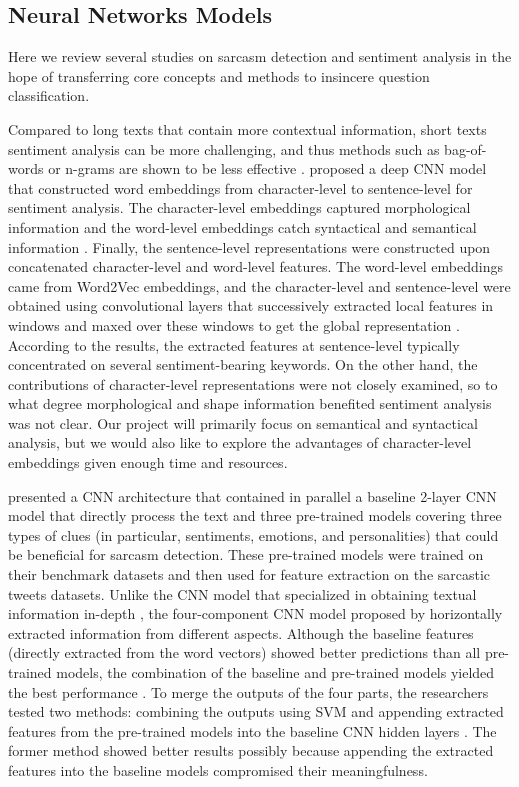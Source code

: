 \documentclass[12pt]{diazessay} %
\begin{document}
\subsection{Neural Networks Models} \label{nn-models}


Here we review several studies on sarcasm detection and sentiment analysis in the hope of transferring core concepts and methods to insincere question classification.

Compared to long texts that contain more contextual information, short texts sentiment analysis can be more challenging, and thus methods such as bag-of-words or n-grams are shown to be less effective \citep{barbosa2010, santos2014}. \citep{santos2014} proposed a deep CNN model that constructed word embeddings from character-level to sentence-level for sentiment analysis. The character-level embeddings captured morphological information and the word-level embeddings catch syntactical and semantical information \citep{santos2014}. Finally, the sentence-level representations were constructed upon concatenated character-level and word-level features. The word-level embeddings came from Word2Vec embeddings, and the character-level and sentence-level were obtained using convolutional layers that successively extracted local features in windows and maxed over these windows to get the global representation \citep{santos2014}. According to the results, the extracted features at sentence-level typically concentrated on several sentiment-bearing keywords. On the other hand, the contributions of character-level representations were not closely examined, so to what degree morphological and shape information benefited sentiment analysis was not clear. Our project will primarily focus on semantical and syntactical analysis, but we would also like to explore the advantages of character-level embeddings given enough time and resources. 

\citet{poria2017} presented a CNN architecture that contained in parallel a baseline 2-layer CNN model that directly process the text and three pre-trained models covering three types of clues (in particular, sentiments, emotions, and personalities) that could be beneficial for sarcasm detection. These pre-trained models were trained on their benchmark datasets and then used for feature extraction on the sarcastic tweets datasets. Unlike the CNN model that specialized in obtaining textual information in-depth \citep{santos2014}, the four-component CNN model proposed by \citet{poria2017} horizontally extracted information from different aspects. Although the baseline features (directly extracted from the word vectors) showed better predictions than all pre-trained models, the combination of the baseline and pre-trained models yielded the best performance \citep{poria2017}. To merge the outputs of the four parts, the researchers tested two methods: combining the outputs using SVM and appending extracted features from the pre-trained models into the baseline CNN hidden layers \citep{poria2017}.  The former method showed better results possibly because appending the extracted features into the baseline models compromised their meaningfulness.\\
\end{document}

